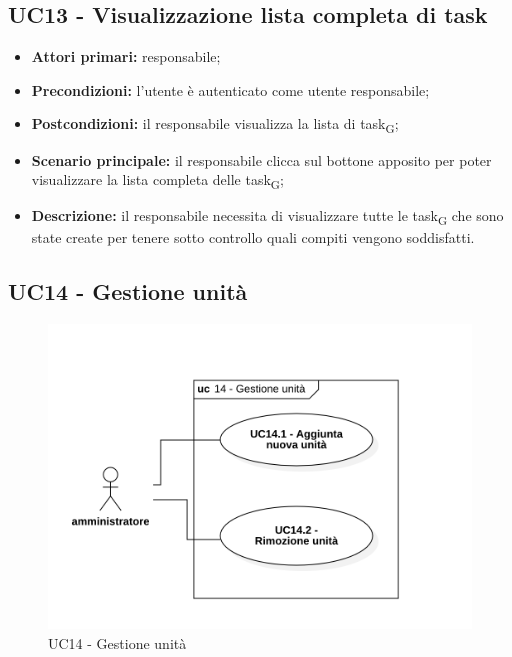 \subsection{UC13 - Visualizzazione lista completa di task}
\begin{itemize}
	\item 	\textbf{Attori primari:} responsabile;
	\item 	\textbf{Precondizioni:} l'utente è autenticato come utente responsabile;
	\item 	\textbf{Postcondizioni:} il responsabile visualizza la lista di task\textsubscript{G};
	\item 	\textbf{Scenario principale:} il responsabile clicca sul bottone apposito per poter visualizzare la lista completa delle task\textsubscript{G};
	\item 	\textbf{Descrizione:} il responsabile necessita di visualizzare tutte le task\textsubscript{G} che sono state create per tenere sotto controllo quali compiti vengono soddisfatti.

\end{itemize}

\subsection{UC14 - Gestione unità}

\begin{figure}[H]
	\centering
	\includegraphics[scale=0.52]{res/images/uc14.png}
	\caption{UC14 - Gestione unità}
\end{figure}

